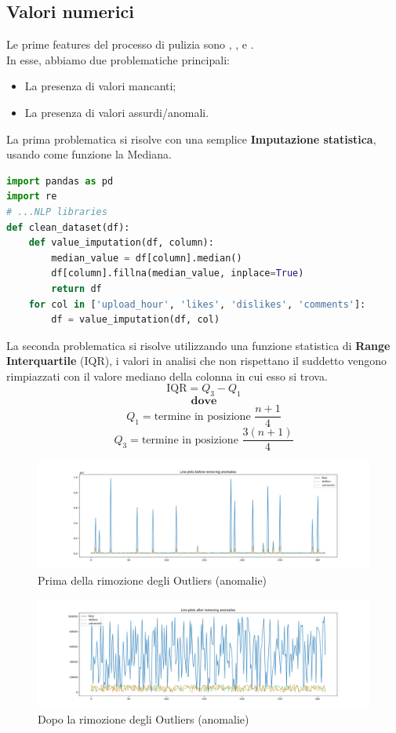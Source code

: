 \documentclass[a4paper,12pt]{report}
\begin{document}
\subsection{Valori numerici}
Le prime features del processo di pulizia sono \texttt{\color{red}{upload\_hour}}, \texttt{\color{red}{likes}}, \texttt{\color{red}{dislikes}} e \texttt{\color{red}{comments}}.\\
In esse, abbiamo due problematiche principali:
\begin{itemize}
        \item La presenza di valori mancanti;
        \item La presenza di valori assurdi/anomali.
\end{itemize}
La prima problematica si risolve con una semplice \textbf{Imputazione statistica}, usando come funzione la Mediana.
\begin{lstlisting}[language=Python]
import pandas as pd
import re
# ...NLP libraries
def clean_dataset(df):
    def value_imputation(df, column):
        median_value = df[column].median()
        df[column].fillna(median_value, inplace=True)
        return df
    for col in ['upload_hour', 'likes', 'dislikes', 'comments']:
        df = value_imputation(df, col)
\end{lstlisting}
La seconda problematica si risolve utilizzando una funzione statistica di \textbf{Range Interquartile} (IQR), i valori in analisi che non rispettano il suddetto vengono rimpiazzati con il valore mediano della colonna in cui esso si trova.
\\
\[
\text{IQR} = Q_3 - Q_1
\]
\[
\textbf{dove}
\]
\[
Q_1 = \text{termine in posizione } \frac{n + 1}{4}
\]
\[
Q_3 = \text{termine in posizione } \frac{3(n + 1)}{4}
\]
\begin{figure}[h]
\centering
\includegraphics[width=\textwidth]{before_IQR.png}
\caption{Prima della rimozione degli Outliers (anomalie)}
\end{figure}
\begin{figure}[h]
\centering
\includegraphics[width=\textwidth]{after_IQR.png}
\caption{Dopo la rimozione degli Outliers (anomalie)}
\end{figure}
\end{document}
